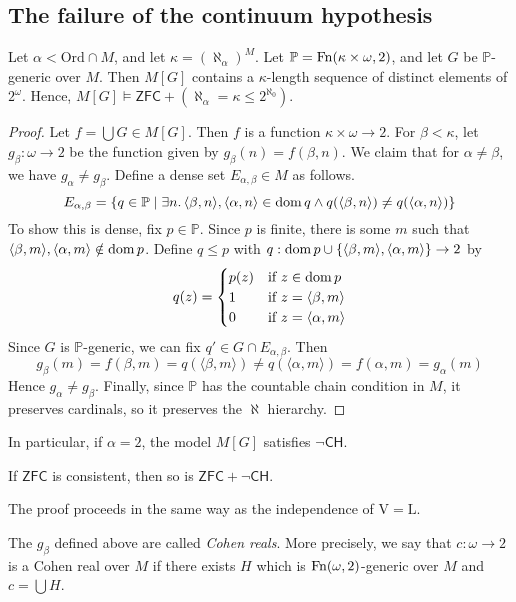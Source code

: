 \subsection{The failure of the continuum hypothesis}
\begin{theorem}
    Let \( \alpha < \mathrm{Ord} \cap M \), and let \( \kappa = (\aleph_\alpha)^M \).
    Let \( \mathbb P = \operatorname{Fn}(\kappa \times \omega, 2) \), and let \( G \) be \( \mathbb P \)-generic over \( M \).
    Then \( M[G] \) contains a \( \kappa \)-length sequence of distinct elements of \( 2^\omega \).
    Hence, \( M[G] \vDash \mathsf{ZFC} + (\aleph_\alpha = \kappa \leq 2^{\aleph_0}) \).
\end{theorem}
\begin{proof}
    Let \( f = \bigcup G \in M[G] \).
    Then \( f \) is a function \( \kappa \times \omega \to 2 \).
    For \( \beta < \kappa \), let \( g_\beta : \omega \to 2 \) be the function given by \( g_\beta(n) = f(\beta, n) \).
    We claim that for \( \alpha \neq \beta \), we have \( g_\alpha \neq g_\beta \).
    Define a dense set \( E_{\alpha,\beta} \in M \) as follows.
    \[ E_{\alpha,\beta} = \qty{q \in \mathbb P \mid \exists n.\, \langle \beta, n \rangle, \langle \alpha, n \rangle \in \operatorname{dom}q \wedge q(\langle \beta, n\rangle) \neq q(\langle \alpha, n \rangle)} \]
    To show this is dense, fix \( p \in \mathbb P \).
    Since \( p \) is finite, there is some \( m \) such that \( \langle \beta, m \rangle, \langle \alpha, m \rangle \notin \operatorname{dom} p \).
    Define \( q \leq p \) with \( q : \operatorname{dom} p \cup \qty{\langle \beta, m \rangle, \langle \alpha, m \rangle} \to 2 \) by
    \[ q(z) = \begin{cases}
        p(z) & \text{if } z \in \operatorname{dom} p \\
        1 & \text{if } z = \langle \beta, m \rangle \\
        0 & \text{if } z = \langle \alpha, m \rangle
    \end{cases} \]
    Since \( G \) is \( \mathbb P \)-generic, we can fix \( q' \in G \cap E_{\alpha,\beta} \).
    Then
    \[ g_\beta(m) = f(\beta, m) = q(\langle \beta, m \rangle) \neq q(\langle \alpha, m \rangle) = f(\alpha, m) = g_\alpha(m) \]
    Hence \( g_\alpha \neq g_\beta \).
    Finally, since \( \mathbb P \) has the countable chain condition in \( M \), it preserves cardinals, so it preserves the \( \aleph \) hierarchy.
\end{proof}
In particular, if \( \alpha = 2 \), the model \( M[G] \) satisfies \( \neg\mathsf{CH} \).
\begin{theorem}
    If \( \mathsf{ZFC} \) is consistent, then so is \( \mathsf{ZFC} + \neg\mathsf{CH} \).
\end{theorem}
The proof proceeds in the same way as the independence of \( \mathrm{V} = \mathrm{L} \).
\begin{definition}
    The \( g_\beta \) defined above are called \emph{Cohen reals}.
    More precisely, we say that \( c : \omega \to 2 \) is a Cohen real over \( M \) if there exists \( H \) which is \( \operatorname{Fn}(\omega, 2) \)-generic over \( M \) and \( c = \bigcup H \).
\end{definition}

